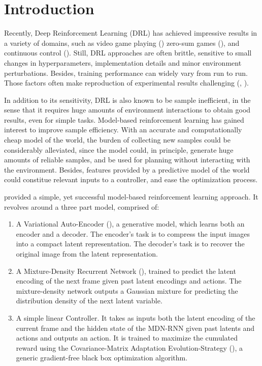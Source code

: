 \documentclass[10pt,a4paper,onecolumn]{article}
\newcommand{\tightlist}{%
  \setlength{\itemsep}{1pt}\setlength{\parskip}{0pt}\setlength{\parsep}{0pt}}
\begin{document}
\hypertarget{introduction}{%
\section{Introduction}\label{introduction}}

Recently, Deep Reinforcement Learning (DRL) has achieved impressive
results in a variety of domains, such as video game playing
(\textcite{mnih}) zero-sum games (\textcite{silver}), and continuous
control (\textcite{ddpg}). Still, DRL approaches are often brittle,
sensitive to small changes in hyperparameters, implementation details
and minor environment perturbations. Besides, training performance can
widely vary from run to run. Those factors often make reproduction of
experimental results challenging (\textcite{henderson},
\textcite{rlblogpost}).

In addition to its sensitivity, DRL is also known to be sample
inefficient, in the sense that it requires huge amounts of environment
interactions to obtain good results, even for simple tasks. Model-based
reinforcement learning has gained interest to improve sample efficiency.
With an accurate and computationally cheap model of the world, the
burden of collecting new samples could be considerably alleviated, since
the model could, in principle, generate huge amounts of reliable
samples, and be used for planning without interacting with the
environment. Besides, features provided by a predictive model of the
world could constitue relevant inputs to a controller, and ease the
optimization process.

\textcite{NIPS2018_7512} provided a simple, yet successful model-based
reinforcement learning approach. It revolves around a three part model,
comprised of:

\begin{enumerate}
\def\labelenumi{\arabic{enumi}.}
\tightlist
\item
  A Variational Auto-Encoder (\textcite{kingma}), a generative model,
  which learns both an encoder and a decoder. The encoder's task is to
  compress the input images into a compact latent representation. The
  decoder's task is to recover the original image from the latent
  representation.
\item
  A Mixture-Density Recurrent Network (\textcite{graves}), trained to
  predict the latent encoding of the next frame given past latent
  encodings and actions. The mixture-density network outputs a Gaussian
  mixture for predicting the distribution density of the next latent
  variable.
\item
  A simple linear Controller. It takes as inputs both the latent
  encoding of the current frame and the hidden state of the MDN-RNN
  given past latents and actions and outputs an action. It is trained to
  maximize the cumulated reward using the Covariance-Matrix Adaptation
  Evolution-Strategy (\textcite{hansen}), a generic gradient-free black
  box optimization algorithm.
\end{enumerate}
\end{document}
